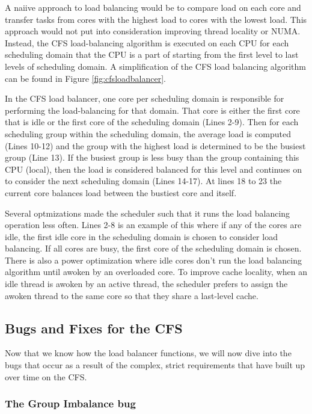 \documentclass{sig-alternate}
\begin{document}
A naiive approach to load balancing would be to compare load on each core and transfer tasks from cores with the highest load to cores with the lowest load. This approach would not put into consideration improving thread locality or NUMA. Instead, the CFS load-balancing algorithm is executed on each CPU for each scheduling domain that the CPU is a part of starting from the first level to last levels of scheduling domain. A simplification of the CFS load balancing algorithm can be found in Figure \ref{fig:cfsloadbalancer}.

In the CFS load balancer, one core per scheduling domain is responsible for performing the load-balancing for that domain. That core is either the first core that is idle or the first core of the scheduling domain (Lines 2-9). Then for each scheduling group within the scheduling domain, the average load is computed (Lines 10-12) and the group with the highest load is determined to be the busiest group (Line 13). If the busiest group is less busy than the group containing this CPU (local), then the load is considered balanced for this level and continues on to consider the next scheduling domain (Lines 14-17). At lines 18 to 23 the current core balances load between the bustiest core and itself.~\cite{Lozi:2016}

Several optmizations made the scheduler such that it runs the load balancing operation less often. Lines 2-8 is an example of this where if any of the cores are idle, the first idle core in the scheduling domain is chosen to consider load balancing. If all cores are busy, the first core of the scheduling domain is chosen. There is also a power optimization where idle cores don't run the load balancing algorithm until awoken by an overloaded core. To improve cache locality, when an idle thread is awoken by an active thread, the scheduler prefers to assign the awoken thread to the same core so that they share a last-level cache.~\cite{Lozi:2016}

\subsection{Bugs and Fixes for the CFS}
\label{sec:cfsbugs}

Now that we know how the load balancer functions, we will now dive into the bugs that occur as a result of the complex, strict requirements that have built up over time on the CFS.

\subsubsection{The Group Imbalance bug}
\label{sec:cfsfault_grpimbalance}
\end{document}
